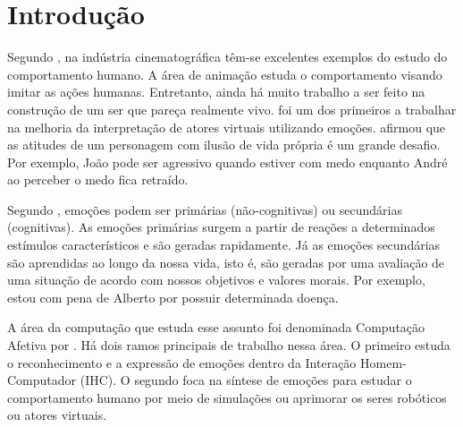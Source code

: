 \chapter{Introdução}


Segundo \citet{terzopoulos1998behavioral}, na indústria cinematográfica têm-se
excelentes exemplos do estudo do comportamento humano.  A área de animação
estuda o comportamento visando imitar as ações humanas.  Entretanto, ainda há
muito trabalho a ser feito na construção de um ser que pareça realmente vivo.
%
\citet{bates1994role} foi um dos primeiros a trabalhar na melhoria da
interpretação de atores virtuais utilizando emoções.
\citeauthor{bates1994role} afirmou que as atitudes de um personagem com ilusão
de vida própria é um grande desafio.  Por exemplo, João pode ser agressivo
quando estiver com medo enquanto André ao perceber o medo fica retraído.

Segundo \citet{damasio2004erro}, emoções podem ser primárias (não-cognitivas)
ou secundárias (cognitivas).  As emoções primárias surgem a partir de reações
a determinados estímulos característicos e são geradas rapidamente.  Já as
emoções secundárias são aprendidas ao longo da nossa vida, isto é, são geradas
por uma avaliação de uma situação de acordo com nossos objetivos e valores
morais.  Por exemplo, estou com pena de Alberto por possuir determinada
doença.

A área da computação que estuda esse assunto foi denominada Computação Afetiva
por \citet{Pic98}.  Há dois ramos principais de trabalho nessa área.  O
primeiro estuda o reconhecimento e a expressão de emoções dentro da Interação
Homem-Computador (IHC).  O segundo foca na síntese de emoções para estudar o
comportamento humano por meio de simulações ou aprimorar os seres robóticos ou
atores virtuais.



